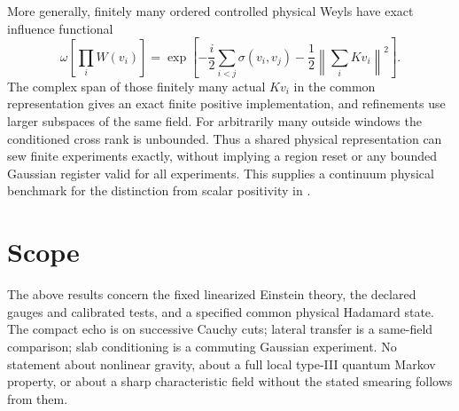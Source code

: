 \documentclass[11pt]{article}
\begin{document}
More generally, finitely many ordered controlled physical Weyls have exact influence functional
\[
 \omega\!\left[\prod_i W(v_i)\right]
 =\exp\!\left[-\frac i2\sum_{i<j}\sigma(v_i,v_j)
                    -\frac12\left\|\sum_i Kv_i\right\|^2\right].
\]
The complex span of those finitely many actual \(Kv_i\) in the common representation gives an exact finite positive implementation, and refinements use larger subspaces of the same field. For arbitrarily many outside windows the conditioned cross rank is unbounded. Thus a shared physical representation can sew finite experiments exactly, without implying a region reset or any bounded Gaussian register valid for all experiments. This supplies a continuum physical benchmark for the distinction from scalar positivity in \cite{positive}.

\section*{Scope}
The above results concern the fixed linearized Einstein theory, the declared gauges and calibrated tests, and a specified common physical Hadamard state. The compact echo is on successive Cauchy cuts; lateral transfer is a same-field comparison; slab conditioning is a commuting Gaussian experiment. No statement about nonlinear gravity, about a full local type-III quantum Markov property, or about a sharp characteristic field without the stated smearing follows from them.
\end{document}
